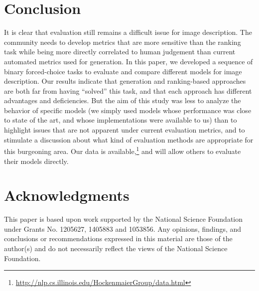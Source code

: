 \documentclass[11pt]{article}
\begin{document}
 \section{Conclusion}
It is  clear that evaluation still remains a difficult issue for image description. The community needs to develop metrics that are more sensitive than the ranking task while being more directly correlated to human judgement than current automated metrics used for generation.  In this paper, we developed a sequence of binary forced-choice tasks to evaluate and compare different models for image description. Our results indicate that generation and ranking-based approaches are both far from having ``solved'' this task, and that each approach has different advantages and deficiencies. But the aim of this study was less to analyze the behavior of specific models (we simply used models whose performance was close to state of the art, and whose implementations were available to us) than to highlight issues that are not apparent under current evaluation metrics, and to stimulate a discussion about what kind of evaluation methods are appropriate for this burgeoning area. Our data is available,\footnote{\tiny\url{http://nlp.cs.illinois.edu/HockenmaierGroup/data.html}} and will allow others to evaluate their models directly. 

\section*{Acknowledgments}
This paper is based upon work supported by the National Science Foundation under Grants No. 
1205627, 1405883 and 1053856. Any opinions, findings, and conclusions or recommendations expressed in this material are those of the author(s) and do not necessarily reflect the views of the National Science Foundation.



\end{document}

